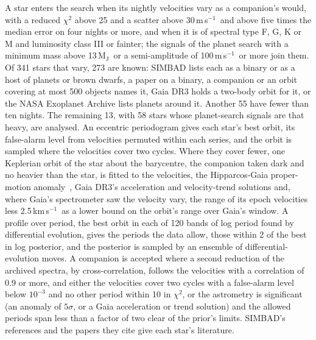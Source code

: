 \documentclass[3p,11pt]{elsarticle}
\newcommand{\kms}{km\,s$^{-1}$}
\newcommand{\ms}{m\,s$^{-1}$}
\newcommand{\Mjup}{M$_\mathrm{J}$}
\begin{document}
A star enters the search when its nightly velocities vary as a companion's would, with a reduced
$\chi^2$ above 25 and a scatter above 30\,\ms\ and above five times the median error on four
nights or more, and when it is of spectral type F, G, K or M and luminosity class III or fainter;
the signals of the planet search with a minimum mass above 13\,\Mjup\ or a semi-amplitude of
100\,\ms\ or more join them. Of 341 stars that vary, 273 are known: SIMBAD lists each as a binary
or as a host of planets or brown dwarfs, a paper on a binary, a companion or an orbit covering at
most 500 objects names it, Gaia DR3 holds a two-body orbit for it, or the NASA Exoplanet Archive
lists planets around it. Another 55 have fewer than ten nights. The remaining 13, with 58 stars
whose planet-search signals are that heavy, are analysed. An eccentric periodogram gives each
star's best orbit, its false-alarm level from velocities permuted within each series, and the
orbit is sampled where the velocities cover two cycles. Where they cover fewer, one Keplerian orbit
of the star about the barycentre, the companion taken dark and no heavier than the star, is fitted
to the velocities, the Hipparcos-Gaia proper-motion anomaly~\cite{Kervella2022}, Gaia DR3's
acceleration and velocity-trend solutions and, where Gaia's spectrometer saw the velocity vary,
the range of its epoch velocities less 2.5\,\kms\ as a lower bound on the orbit's range over
Gaia's window. A profile over period, the best orbit in each of 120 bands of log
period found by differential evolution, gives the periods the data allow, those within 2 of the
best in log posterior, and the posterior is sampled by an ensemble of differential-evolution moves.
A companion is accepted where a second reduction of the archived spectra, by cross-correlation,
follows the velocities with a correlation of 0.9 or more, and either the velocities cover two
cycles with a false-alarm level below $10^{-3}$ and no other period within 10 in $\chi^2$, or the
astrometry is significant (an anomaly of $5\sigma$, or a Gaia acceleration or trend solution) and
the allowed periods span less than a factor of two clear of the prior's limits. SIMBAD's references
and the papers they cite give each star's literature.
\end{document}
